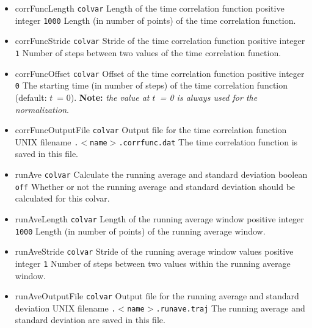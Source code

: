 \begin{itemize}
\item %
  \keydef
    {corrFuncLength}{%
    \texttt{colvar}}{%
    Length of the time correlation function}{%
    positive integer}{%
    \texttt{1000}}{%
    Length (in number of points) of the time correlation function.}

\item %
  \keydef
    {corrFuncStride}{%
    \texttt{colvar}}{%
    Stride of the time correlation function}{%
    positive integer}{%
    \texttt{1}}{%
    Number of steps between two values of the time correlation function.}

\item %
  \keydef
    {corrFuncOffset}{%
    \texttt{colvar}}{%
    Offset of the time correlation function}{%
    positive integer}{%
    \texttt{0}}{%
    The starting time (in number of steps) of the time correlation
    function (default: $t$~= 0).  \textbf{Note:} \emph{the value at $t$~= 0 is always
    used for the normalization}.}

\item %
  \keydef
    {corrFuncOutputFile}{%
    \texttt{colvar}}{%
    Output file for the time correlation function}{%
    UNIX filename}{%
    \outputName\texttt{.$<$name$>$.corrfunc.dat}}{%
    The time correlation function is saved in this file.}

\item %
  \keydef
    {runAve}{%
    \texttt{colvar}}{%
    Calculate the running average and standard deviation}{%
    boolean}{%
    \texttt{off}}{%
    Whether or not the running average and standard deviation should
    be calculated for this colvar.}

\item %
  \keydef
    {runAveLength}{%
    \texttt{colvar}}{%
    Length of the running average window}{%
    positive integer}{%
    \texttt{1000}}{%
    Length (in number of points) of the running average window.}

\item %
  \keydef
    {runAveStride}{%
    \texttt{colvar}}{%
    Stride of the running average window values}{%
    positive integer}{%
    \texttt{1}}{%
    Number of steps between two values within the running average window.}

\item %
  \keydef
    {runAveOutputFile}{%
    \texttt{colvar}}{%
    Output file for the running average and standard deviation}{%
    UNIX filename}{%
    \outputName\texttt{.$<$name$>$.runave.traj}}{%
    The running average and standard deviation are saved in this file.}

\end{itemize}


